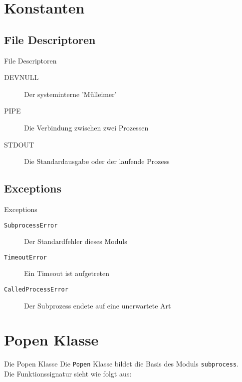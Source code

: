 \section{Konstanten}
\subsection{File Descriptoren}
\begin{frame}{File Descriptoren}
	\begin{description}
		\item[DEVNULL] Der systeminterne 'M\"ulleimer'
		\item[PIPE] Die Verbindung zwischen zwei Prozessen
		\item[STDOUT] Die Standardausgabe oder der laufende Prozess
	\end{description}
\end{frame}

\subsection{Exceptions}
\begin{frame}[fragile]{Exceptions}
	\begin{description}
		\item[\texttt{SubprocessError}] Der Standardfehler dieses Moduls
		\item[\texttt{TimeoutError}] Ein Timeout ist aufgetreten
		\item[\texttt{CalledProcessError}] Der Subprozess endete auf eine unerwartete Art
	\end{description}
\end{frame}


\section{Popen Klasse}
\begin{frame}[fragile]{Die Popen Klasse}
	Die \texttt{Popen} Klasse bildet die Basis des Moduls \texttt{subprocess}. \\
	Die Funktionssignatur sieht wie folgt aus:
	
\end{frame}

